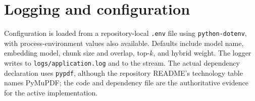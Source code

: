 \section{Logging and configuration}
Configuration is loaded from a repository-local \texttt{.env} file using \texttt{python-dotenv}, with process-environment values also available. Defaults include model name, embedding model, chunk size and overlap, top-$k$, and hybrid weight. The logger writes to \texttt{logs/application.log} and to the stream. The actual dependency declaration uses \texttt{pypdf}, although the repository README's technology table names PyMuPDF; the code and dependency file are the authoritative evidence for the active implementation.
